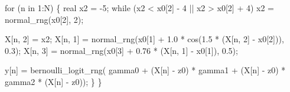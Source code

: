 \documentclass[
  letterpaper,
  DIV=11,
  numbers=noendperiod]{scrartcl}
\newenvironment{Shaded}{\begin{snugshade}}{\end{snugshade}}
\newcommand{\ControlFlowTok}[1]{\textcolor[rgb]{0.00,0.23,0.31}{#1}}
\newcommand{\DataTypeTok}[1]{\textcolor[rgb]{0.68,0.00,0.00}{#1}}
\newcommand{\DecValTok}[1]{\textcolor[rgb]{0.68,0.00,0.00}{#1}}
\newcommand{\FloatTok}[1]{\textcolor[rgb]{0.68,0.00,0.00}{#1}}
\newcommand{\NormalTok}[1]{\textcolor[rgb]{0.00,0.23,0.31}{#1}}
\begin{document}
\begin{codelisting}
\begin{Shaded}
\begin{Highlighting}[]
  \ControlFlowTok{for}\NormalTok{ (n }\ControlFlowTok{in} \DecValTok{1}\NormalTok{:N) \{}
    \DataTypeTok{real}\NormalTok{ x2 = {-}}\DecValTok{5}\NormalTok{;}
    \ControlFlowTok{while}\NormalTok{ (x2 \textless{} x0[}\DecValTok{2}\NormalTok{] {-} }\DecValTok{4}\NormalTok{ || x2 \textgreater{} x0[}\DecValTok{2}\NormalTok{] + }\DecValTok{4}\NormalTok{)}
\NormalTok{      x2 = normal\_rng(x0[}\DecValTok{2}\NormalTok{], }\DecValTok{2}\NormalTok{);}
    
\NormalTok{    X[n, }\DecValTok{2}\NormalTok{] = x2;}
\NormalTok{    X[n, }\DecValTok{1}\NormalTok{] = normal\_rng(x0[}\DecValTok{1}\NormalTok{] + }\FloatTok{1.0}\NormalTok{ * cos(}\FloatTok{1.5}\NormalTok{ * (X[n, }\DecValTok{2}\NormalTok{] {-} x0[}\DecValTok{2}\NormalTok{])), }\FloatTok{0.3}\NormalTok{);}
\NormalTok{    X[n, }\DecValTok{3}\NormalTok{] = normal\_rng(x0[}\DecValTok{3}\NormalTok{] + }\FloatTok{0.76}\NormalTok{ * (X[n, }\DecValTok{1}\NormalTok{] {-} x0[}\DecValTok{1}\NormalTok{]), }\FloatTok{0.5}\NormalTok{);}

\NormalTok{    y[n] = bernoulli\_logit\_rng(  gamma0 }
\NormalTok{                               + (X[n] {-} z0\textquotesingle{}) * gamma1}
\NormalTok{                               + (X[n] {-} z0\textquotesingle{}) * gamma2 * (X[n] {-} z0\textquotesingle{})\textquotesingle{});}
\NormalTok{  \}}
\NormalTok{\}}
\end{Highlighting}
\end{Shaded}

\end{codelisting}
\end{document}
